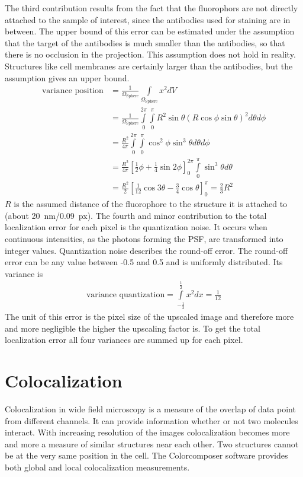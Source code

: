 The third contribution results from the fact that the fluorophors are not directly attached to the sample of interest, since the antibodies used for staining are in between. The upper bound of this error can be estimated under the assumption that the target of the antibodies is much smaller than the antibodies, so that there is no occlusion in the projection. This assumption does not hold in reality. Structures like cell membranes are certainly larger than the antibodies, but the assumption gives an upper bound. 
\begin{align}
\text{variance position} &=\frac{1}{\Omega_\text{Sphere}}\int\limits_{\Omega_\text{Sphere}} x^2 dV\\ 
&=\frac{1}{\Omega_\text{Sphere}}\int\limits_0^{2\pi}\int\limits_0^\pi R^2\sin\theta \left(R\cos\phi \sin\theta\right)^2 d\theta d\phi\\
&=\frac{R^2}{4\pi} \int\limits_0^{2\pi}\int\limits_0^\pi \cos^2\phi \sin^3\theta d\theta d\phi\\
&=\frac{R^2}{4\pi} \left[\frac{1}{2}\phi +\frac{1}{4}\sin 2\phi \right]_0^{2\pi}\int\limits_0^\pi \sin^3\theta d\theta \\
&=\frac{ R^2}{2} \left[\frac{1}{12}\cos3\theta -\frac{3}{4}\cos\theta \right]_0^\pi=\frac{2}{3} R^2
\end{align}
$R$ is the assumed distance of the fluorophore to the structure it is attached to (about 20~nm/0.09~px).\newline
The fourth and minor contribution to the total localization error for each pixel is the quantization noise. It occurs when continuous intensities, as the photons forming the PSF, are transformed into integer values. Quantization noise describes the round-off error. The round-off error can be any value between -0.5 and 0.5 and is uniformly distributed. Its variance is
\begin{align}
 \text{variance quantization} =\int\limits_{-\frac{1}{2}}^{\frac{1}{2}} x^2 dx = \frac{1}{12}
\end{align}
The unit of this error is the pixel size of the upscaled image and therefore more and more negligible the higher the upscaling factor is.\newline
To get the total localization error all four variances are summed up for each pixel.

\section{Colocalization}
Colocalization in wide field microscopy is a measure of the overlap of data point from different channels. It can provide information whether or not two molecules interact. With increasing resolution of the images colocalization becomes more and more a measure of similar structures near each other. Two structures cannot be at the very same position in the cell. The Colorcomposer software provides both global and local colocalization measurements.
